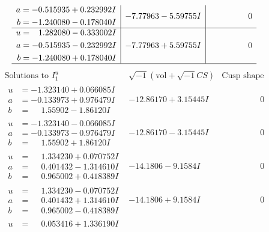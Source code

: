 \documentclass[1p]{elsarticle_modified}
\theoremstyle{definition}
\newcommand{\I}{\sqrt{-1}}
\begin{document}
$$\begin{array}{c|c|c}
\begin{aligned}
a &= -0.515935 + 0.232992 I \\
b &= -1.240080 - 0.178040 I\end{aligned}
 & -7.77963 - 5.59755 I & \phantom{-0.000000 } 0 \\ \hline\begin{aligned}
u &= \phantom{-}1.282080 - 0.333002 I \\
a &= -0.515935 - 0.232992 I \\
b &= -1.240080 + 0.178040 I\end{aligned}
 & -7.77963 + 5.59755 I & \phantom{-0.000000 } 0\\
 \hline 
 \end{array}$$\newpage$$\begin{array}{c|c|c}  
\text{Solutions to }I^u_{1}& \I (\text{vol} + \sqrt{-1}CS) & \text{Cusp shape}\\
 \hline 
\begin{aligned}
u &= -1.323140 + 0.066085 I \\
a &= -0.133973 + 0.976479 I \\
b &= \phantom{-}1.55902 - 1.86120 I\end{aligned}
 & -12.86170 + 3.15445 I & \phantom{-0.000000 } 0 \\ \hline\begin{aligned}
u &= -1.323140 - 0.066085 I \\
a &= -0.133973 - 0.976479 I \\
b &= \phantom{-}1.55902 + 1.86120 I\end{aligned}
 & -12.86170 - 3.15445 I & \phantom{-0.000000 } 0 \\ \hline\begin{aligned}
u &= \phantom{-}1.334230 + 0.070752 I \\
a &= \phantom{-}0.401432 - 1.314610 I \\
b &= \phantom{-}0.965002 + 0.418389 I\end{aligned}
 & -14.1806 - 9.1584 I & \phantom{-0.000000 } 0 \\ \hline\begin{aligned}
u &= \phantom{-}1.334230 - 0.070752 I \\
a &= \phantom{-}0.401432 + 1.314610 I \\
b &= \phantom{-}0.965002 - 0.418389 I\end{aligned}
 & -14.1806 + 9.1584 I & \phantom{-0.000000 } 0 \\ \hline\begin{aligned}
u &= \phantom{-}0.053416 + 1.336190 I \\

\end{aligned}
\end{array}$$
\end{document}
